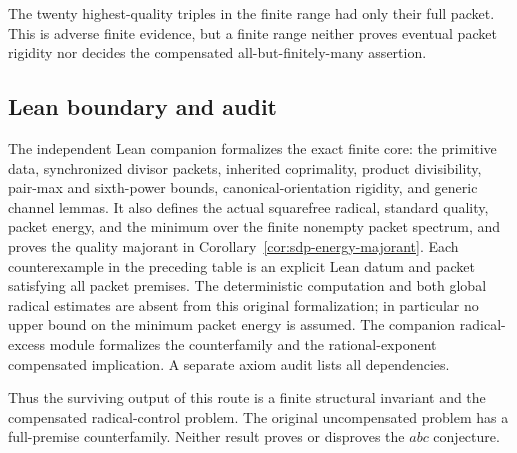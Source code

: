 The twenty highest-quality triples in the finite range had only their full
packet.  This is adverse finite evidence, but a finite range neither proves
eventual packet rigidity nor decides the compensated all-but-finitely-many
assertion.

\subsection{Lean boundary and audit}

The independent Lean companion formalizes the exact finite core: the
primitive data, synchronized divisor packets, inherited coprimality, product
divisibility, pair-max and sixth-power bounds, canonical-orientation rigidity,
and generic channel lemmas.  It also defines the actual squarefree radical,
standard quality, packet energy, and the minimum over the finite nonempty
packet spectrum, and proves the quality majorant in
Corollary~\ref{cor:sdp-energy-majorant}.  Each counterexample in the preceding table is
an explicit Lean datum and packet satisfying all packet premises.  The
deterministic computation and both global radical estimates are absent from
this original formalization; in particular no upper bound on the minimum
packet energy is assumed.  The companion radical-excess module formalizes the
counterfamily and the rational-exponent compensated implication.  A separate
axiom audit lists all dependencies.

Thus the surviving output of this route is a finite structural invariant and
the compensated radical-control problem.  The original uncompensated problem
has a full-premise counterfamily.  Neither result proves or disproves the
$abc$ conjecture.


